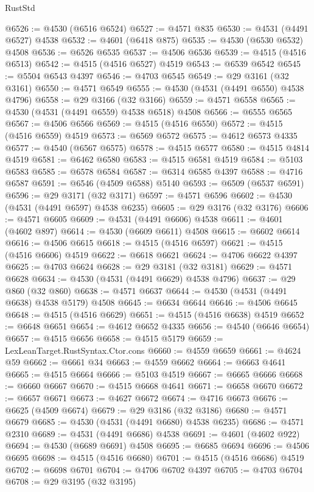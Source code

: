 \begin{lexlean}{RustStd}
\begin{coremodule}
{\begin{coremodule}
{{{{{{{{{{{{{{{{{{{{{{{{{{{{{{{{{{{{{{{{{{{{{{{{{{{{{{{@6526 := @4530 (@6516 @6524)
@6527 := @4571 @835
@6530 := @4531 (@4491 @6527) @4538
@6532 := @4601 (@6418 @875)
@6535 := @4530 (@6530 @6532) @4508
@6536 := @6526 @6535
@6537 := @4506 @6536
@6539 := @4515 (@4516 @6513)
@6542 := @4515 (@4516 @6527) @4519
@6543 := @6539 @6542
@6545 := @5504 @6543 @4397
@6546 := @4703 @6545
@6549 := @29 @3161 (@32 @3161)
@6550 := @4571 @6549
@6555 := @4530 (@4531 (@4491 @6550) @4538 @4796)
@6558 := @29 @3166 (@32 @3166)
@6559 := @4571 @6558
@6565 := @4530 (@4531 (@4491 @6559) @4538 @6518) @4508
@6566 := @6555 @6565
@6567 := @4506 @6566
@6569 := @4515 (@4516 @6550)
@6572 := @4515 (@4516 @6559) @4519
@6573 := @6569 @6572
@6575 := @4612 @6573 @4335
@6577 := @4540 (@6567 @6575)
@6578 := @4515 @6577
@6580 := @4515 @4814 @4519
@6581 := @6462 @6580
@6583 := @4515 @6581 @4519
@6584 := @5103 @6583
@6585 := @6578 @6584
@6587 := @6314 @6585 @4397
@6588 := @4716 @6587
@6591 := @6546 (@4509 @6588) @5140
@6593 := @6509 (@6537 @6591)
@6596 := @29 @3171 (@32 @3171)
@6597 := @4571 @6596
@6602 := @4530 (@4531 (@4491 @6597) @4538 @6235)
@6605 := @29 @3176 (@32 @3176)
@6606 := @4571 @6605
@6609 := @4531 (@4491 @6606) @4538
@6611 := @4601 (@4602 @897)
@6614 := @4530 (@6609 @6611) @4508
@6615 := @6602 @6614
@6616 := @4506 @6615
@6618 := @4515 (@4516 @6597)
@6621 := @4515 (@4516 @6606) @4519
@6622 := @6618 @6621
@6624 := @4706 @6622 @4397
@6625 := @4703 @6624
@6628 := @29 @3181 (@32 @3181)
@6629 := @4571 @6628
@6634 := @4530 (@4531 (@4491 @6629) @4538 @4796)
@6637 := @29 @860 (@32 @860)
@6638 := @4571 @6637
@6644 := @4530 (@4531 (@4491 @6638) @4538 @5179) @4508
@6645 := @6634 @6644
@6646 := @4506 @6645
@6648 := @4515 (@4516 @6629)
@6651 := @4515 (@4516 @6638) @4519
@6652 := @6648 @6651
@6654 := @4612 @6652 @4335
@6656 := @4540 (@6646 @6654)
@6657 := @4515 @6656
@6658 := @4515 @5179
@6659 := LexLeanTarget.RustSyntax.Ctor.cons
@6660 := @4559 @6659
@6661 := @4624 @59
@6662 := @6661 @34
@6663 := @4559 @6662
@6664 := @6663 @4641
@6665 := @4515 @6664
@6666 := @5103 @4519
@6667 := @6665 @6666
@6668 := @6660 @6667
@6670 := @4515 @6668 @4641
@6671 := @6658 @6670
@6672 := @6657 @6671
@6673 := @4627 @6672
@6674 := @4716 @6673
@6676 := @6625 (@4509 @6674)
@6679 := @29 @3186 (@32 @3186)
@6680 := @4571 @6679
@6685 := @4530 (@4531 (@4491 @6680) @4538 @6235)
@6686 := @4571 @2310
@6689 := @4531 (@4491 @6686) @4538
@6691 := @4601 (@4602 @922)
@6694 := @4530 (@6689 @6691) @4508
@6695 := @6685 @6694
@6696 := @4506 @6695
@6698 := @4515 (@4516 @6680)
@6701 := @4515 (@4516 @6686) @4519
@6702 := @6698 @6701
@6704 := @4706 @6702 @4397
@6705 := @4703 @6704
@6708 := @29 @3195 (@32 @3195)
}}}}}}}}}}}}}}}}}}}}}}}}}}}}}}}}}}}}}}}}}}}}}}}}}}}}}}}
\end{coremodule}}
\end{coremodule}
\end{lexlean}

